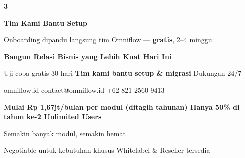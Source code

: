 \documentclass[a4paper]{article}
\begin{document}
\begin{center}
\begin{minipage}[t]{0.318\textwidth}
{\begin{minipage}[t][4.7cm][c]{\dimexpr\linewidth-2\fboxsep\relax}
            \begin{center}
                {\fontsize{22}{26}\selectfont\bfseries\color{BluePrimary} 3}
            \end{center}
            \vspace{2pt}
            \begin{center}
                {\fontsize{10}{13}\selectfont\bfseries\color{BlueDark} Tim Kami Bantu Setup}\par\vspace{3pt}
                {\fontsize{9}{12}\selectfont\color{TextDark} Onboarding dipandu langsung tim Omniflow --- \textbf{gratis}, 2--4 minggu.}
            \end{center}
        \end{minipage}}
\end{minipage}
\end{center}

\vspace{8pt}

{\setlength{\fboxsep}{10pt}\setlength{\fboxrule}{0pt}%
\noindent\colorbox{BluePrimary}{%
    \begin{minipage}{\dimexpr\textwidth-2\fboxsep\relax}
        \centering
        {\fontsize{13}{16}\selectfont\bfseries\color{White}
        Bangun Relasi Bisnis yang Lebih Kuat Hari Ini}\par\vspace{3pt}
        {\fontsize{9.5}{12}\selectfont\color{BlueMid}
        Uji coba gratis 30 hari \enspace\textbullet\enspace \textbf{Tim kami bantu setup \& migrasi} \enspace\textbullet\enspace Dukungan 24/7}\par\vspace{2pt}
        {\fontsize{9.5}{12}\selectfont\color{BlueLight}
        omniflow.id \enspace\textbullet\enspace contact@omniflow.id \enspace\textbullet\enspace +62 821 2560 9413}
    \end{minipage}}}


\vspace{6pt}

{\setlength{\fboxsep}{8pt}\setlength{\fboxrule}{0pt}%
\noindent\colorbox{BlueBg}{%
    \begin{minipage}{\dimexpr\textwidth-2\fboxsep\relax}
        \centering
        {\fontsize{9}{12}\selectfont\bfseries\color{BluePrimary}
        Mulai Rp 1,67jt/bulan per modul (ditagih tahunan) \enspace\textbullet\enspace Hanya 50\% di tahun ke-2 \enspace\textbullet\enspace Unlimited Users}\par\vspace{1pt}
        {\fontsize{8.5}{11}\selectfont\color{BlueDark}
        Semakin banyak modul, semakin hemat}\par\vspace{1pt}
        {\fontsize{8}{10}\selectfont\color{TextLight}
        Negotiable untuk kebutuhan khusus \enspace\textbullet\enspace Whitelabel \& Reseller tersedia}
    \end{minipage}}}

\restoregeometry
\pagestyle{empty}
\end{document}
